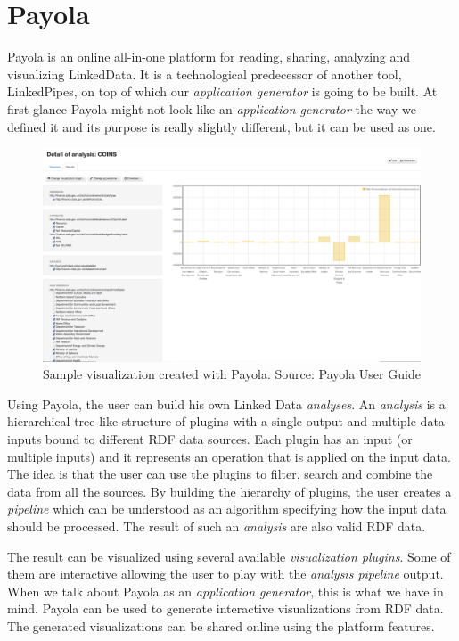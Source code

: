 \section{Payola}

Payola \cite{payola} is an online all-in-one platform for reading, sharing, analyzing and visualizing LinkedData. It is a technological predecessor of another tool, LinkedPipes, on top of which our \emph{application generator} is going to be built. At first glance Payola might not look like an \emph{application generator} the way we defined it and its purpose is really slightly different, but it can be used as one.

\begin{figure}
	\centering
	\includegraphics[width=140mm]{img/02_payola.png}
	\caption{Sample visualization created with Payola. Source: Payola User Guide \cite{payola_user_guide}} 
	\label{fig:payola-example}
\end{figure}

Using Payola, the user can build his own Linked Data \emph{analyses}. An \emph{analysis} is a hierarchical tree-like structure of plugins with a single output and multiple data inputs bound to different RDF data sources. Each plugin has an input (or multiple inputs) and it represents an operation that is applied on the input data. The idea is that the user can use the plugins to filter, search and combine the data from all the sources. By building the hierarchy of plugins, the user creates a \emph{pipeline} which can be understood as an algorithm specifying how the input data should be processed. The result of such an \emph{analysis} are also valid RDF data.

The result can be visualized using several available \emph{visualization plugins}. Some of them are interactive allowing the user to play with the \emph{analysis pipeline} output. When we talk about Payola as an \emph{application generator}, this is what we have in mind. Payola can be used to generate interactive visualizations from RDF data. The generated visualizations can be shared online using the platform features.

